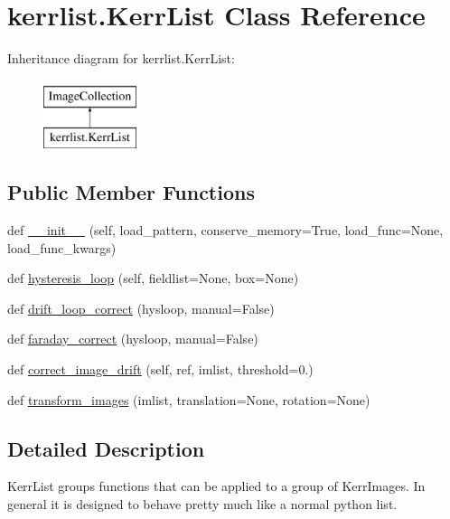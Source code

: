 \hypertarget{classkerrlist_1_1_kerr_list}{}\section{kerrlist.\+Kerr\+List Class Reference}
\label{classkerrlist_1_1_kerr_list}
Inheritance diagram for kerrlist.\+Kerr\+List\+:\begin{figure}[H]
\begin{center}
\leavevmode
\includegraphics[height=2.000000cm]{classkerrlist_1_1_kerr_list}
\end{center}
\end{figure}
\subsection*{Public Member Functions}
\begin{DoxyCompactItemize}
\item 
def \hyperlink{classkerrlist_1_1_kerr_list_a6f3bf73e2595c3a2a4b2aa49147d405f}{\+\_\+\+\_\+init\+\_\+\+\_\+} (self, load\+\_\+pattern, conserve\+\_\+memory=True, load\+\_\+func=None, load\+\_\+func\+\_\+kwargs)
\item 
def \hyperlink{classkerrlist_1_1_kerr_list_a1a59547bb6113d06a09c615ec065ed44}{hysteresis\+\_\+loop} (self, fieldlist=None, box=None)
\item 
def \hyperlink{classkerrlist_1_1_kerr_list_a278b5b346bae5e1e5780c7805ab9ebac}{drift\+\_\+loop\+\_\+correct} (hysloop, manual=False)
\item 
def \hyperlink{classkerrlist_1_1_kerr_list_aca95a7b5d663e5724fdf2e249c3f1445}{faraday\+\_\+correct} (hysloop, manual=False)
\item 
def \hyperlink{classkerrlist_1_1_kerr_list_a3f84d6f283bf77c30e753fe7c90678f6}{correct\+\_\+image\+\_\+drift} (self, ref, imlist, threshold=0.)
\item 
def \hyperlink{classkerrlist_1_1_kerr_list_a9abcf1aa70e0ac1d003040ff9739acfb}{transform\+\_\+images} (imlist, translation=None, rotation=None)
\end{DoxyCompactItemize}


\subsection{Detailed Description}
\begin{DoxyVerb}KerrList groups functions that can be applied to a group of KerrImages.
In general it is designed to behave pretty much like a normal python list.
\end{DoxyVerb}
 

